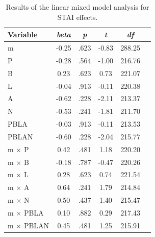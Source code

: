 \begin{table}[h]
    \centering
    \caption{Results of the linear mixed model analysis for STAI effects.}
    \label{tab:lmm_stai}
    \begin{tabular}{lccccc}
        \hline
        Variable & \textit{beta} & \textit{p} & \textit{t} & \textit{df} \\
        \hline
        m & -0.25 & .623 & -0.83 & 288.25 \\
        P & -0.28 & .564 & -1.00 & 216.76 \\
        B & 0.23 & .623 & 0.73 & 221.07 \\
        L & -0.04 & .913 & -0.11 & 220.38 \\
        A & -0.62 & .228 & -2.11 & 213.37 \\
        N & -0.53 & .241 & -1.81 & 211.70 \\
        PBLA & -0.03 & .913 & -0.11 & 213.53 \\
        PBLAN & -0.60 & .228 & -2.04 & 215.77 \\
        m $\times$ P & 0.42 & .481 & 1.18 & 220.20 \\
        m $\times$ B & -0.18 & .787 & -0.47 & 220.26 \\
        m $\times$ L & 0.28 & .623 & 0.74 & 221.54 \\
        m $\times$ A & 0.64 & .241 & 1.79 & 214.84 \\
        m $\times$ N & 0.50 & .437 & 1.40 & 215.47 \\
        m $\times$ PBLA & 0.10 & .882 & 0.29 & 217.43 \\
        m $\times$ PBLAN & 0.45 & .481 & 1.25 & 215.91 \\
        \hline
    \end{tabular}
\end{table}